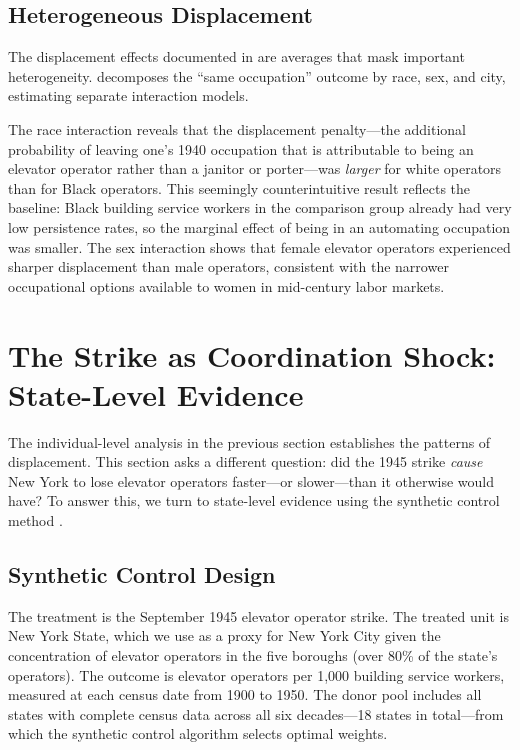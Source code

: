 \documentclass[12pt]{article}
\begin{document}
\subsection{Heterogeneous Displacement}

The displacement effects documented in  are averages that mask important heterogeneity.  decomposes the ``same occupation'' outcome by race, sex, and city, estimating separate interaction models.



The race interaction reveals that the displacement penalty---the additional probability of leaving one's 1940 occupation that is attributable to being an elevator operator rather than a janitor or porter---was \emph{larger} for white operators than for Black operators. This seemingly counterintuitive result reflects the baseline: Black building service workers in the comparison group already had very low persistence rates, so the marginal effect of being in an automating occupation was smaller. The sex interaction shows that female elevator operators experienced sharper displacement than male operators, consistent with the narrower occupational options available to women in mid-century labor markets.



\section{The Strike as Coordination Shock: State-Level Evidence} \label{sec:scm}

The individual-level analysis in the previous section establishes the patterns of displacement. This section asks a different question: did the 1945 strike \emph{cause} New York to lose elevator operators faster---or slower---than it otherwise would have? To answer this, we turn to state-level evidence using the synthetic control method \citep{abadie2010, abadie2015}.

\subsection{Synthetic Control Design}

The treatment is the September 1945 elevator operator strike. The treated unit is New York State, which we use as a proxy for New York City given the concentration of elevator operators in the five boroughs (over 80\% of the state's operators). The outcome is elevator operators per 1,000 building service workers, measured at each census date from 1900 to 1950. The donor pool includes all states with complete census data across all six decades---18 states in total---from which the synthetic control algorithm selects optimal weights.
\end{document}

